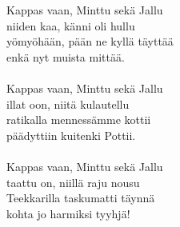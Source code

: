 
Kappas vaan, Minttu sekä Jallu \\
niiden kaa, känni oli hullu \\
yömyöhään, pään ne kyllä täyttää \\
enkä nyt muista mittää. \\

\hspace{10mm} \\

Kappas vaan, Minttu sekä Jallu\\
illat oon, niitä kulautellu\\
ratikalla mennessämme kottii\\
päädyttiin kuitenki Pottii.\\

\hspace{10mm} \\

Kappas vaan, Minttu sekä Jallu\\
taattu on, niillä raju nousu\\
Teekkarilla taskumatti täynnä\\
kohta jo harmiksi tyyhjä!\\